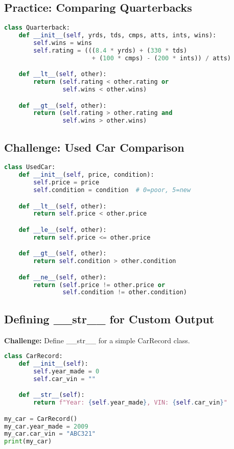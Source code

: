 \subsection*{Practice: Comparing Quarterbacks}

\begin{lstlisting}[language=Python]
class Quarterback:
    def __init__(self, yrds, tds, cmps, atts, ints, wins):
        self.wins = wins
        self.rating = (((8.4 * yrds) + (330 * tds)
                        + (100 * cmps) - (200 * ints)) / atts)

    def __lt__(self, other):
        return (self.rating < other.rating or
                self.wins < other.wins)

    def __gt__(self, other):
        return (self.rating > other.rating and
                self.wins > other.wins)
\end{lstlisting}

\subsection*{Challenge: Used Car Comparison}

\begin{lstlisting}[language=Python]
class UsedCar:
    def __init__(self, price, condition):
        self.price = price
        self.condition = condition  # 0=poor, 5=new

    def __lt__(self, other):
        return self.price < other.price

    def __le__(self, other):
        return self.price <= other.price

    def __gt__(self, other):
        return self.condition > other.condition

    def __ne__(self, other):
        return (self.price != other.price or
                self.condition != other.condition)
\end{lstlisting}

\subsection*{Defining \_\_str\_\_ for Custom Output}

\textbf{Challenge:} Define \_\_str\_\_ for a simple CarRecord class.

\begin{lstlisting}[language=Python]
class CarRecord:
    def __init__(self):
        self.year_made = 0
        self.car_vin = ""

    def __str__(self):
        return f"Year: {self.year_made}, VIN: {self.car_vin}"

my_car = CarRecord()
my_car.year_made = 2009
my_car.car_vin = "ABC321"
print(my_car)
\end{lstlisting}

